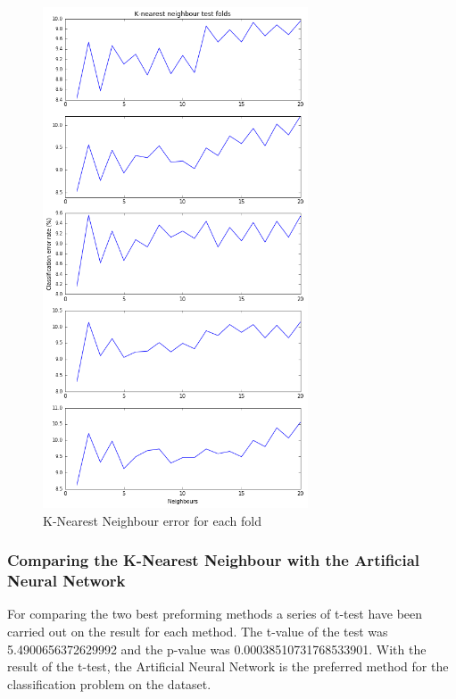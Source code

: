 \vspace{-5pt}
\begin{figure}[h]
	\centering
	\includegraphics[width=0.7\textwidth]{Fig/classification_KNN}
	\vspace{-5pt}
	\caption{K-Nearest Neighbour error for each fold}
	\label{fig:classification_KNN}
\end{figure}

\subsubsection{Comparing the K-Nearest Neighbour with the Artificial Neural Network}
For comparing the two best preforming methods a series of t-test have been carried out on the result for each method. The t-value of the test was 5.4900656372629992 and the p-value was 0.00038510731768533901. With the result of the t-test, the Artificial Neural Network is the preferred method for the classification problem on the dataset. 